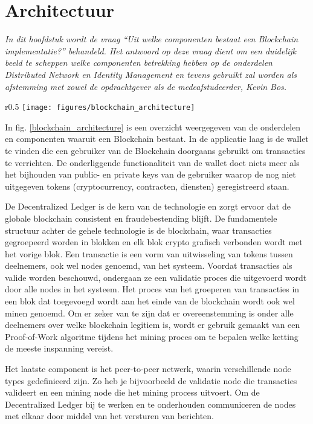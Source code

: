 \section{Architectuur}
\label{chapter:architecture}

\textit{
  In dit hoofdstuk wordt de vraag ``Uit welke componenten bestaat een Blockchain implementatie?'' behandeld. Het antwoord op deze vraag dient om een duidelijk beeld te scheppen welke componenten betrekking hebben op de onderdelen Distributed Network en Identity Management en tevens gebruikt zal worden als afstemming met zowel de opdrachtgever als de medeafstudeerder, Kevin Bos. 
}

\begin{wrapfigure}{r}{0.5\textwidth}
  \texttt{[image: figures/blockchain\_architecture]}
  \caption{Blockchain architectuur}
  \label{blockchain_architecture}
\end{wrapfigure}

In fig. \ref{blockchain_architecture} is een overzicht weergegeven van de onderdelen en componenten waaruit een Blockchain bestaat. In de applicatie laag is de wallet te vinden die een gebruiker van de Blockchain doorgaans gebruikt om transacties te verrichten. De onderliggende functionaliteit van de wallet doet niets meer als het bijhouden van public- en private keys van de gebruiker waarop de nog niet uitgegeven tokens (cryptocurrency, contracten, diensten) geregistreerd staan.

De Decentralized Ledger is de kern van de technologie en zorgt ervoor dat de globale blockchain consistent en fraudebestending blijft. De fundamentele structuur achter de gehele technologie is de blockchain, waar transacties gegroepeerd worden in blokken en elk blok crypto grafisch verbonden wordt met het vorige blok. Een transactie is een vorm van uitwisseling van tokens tussen deelnemers, ook wel nodes genoemd, van het systeem. Voordat transacties als valide worden beschouwd, ondergaan ze een validatie proces die uitgevoerd wordt door alle nodes in het systeem. Het proces van het groeperen van transacties in een blok dat toegevoegd wordt aan het einde van de blockchain wordt ook wel minen genoemd. Om er zeker van te zijn dat er overeenstemming is onder alle deelnemers over welke blockchain legitiem is, wordt er gebruik gemaakt van een Proof-of-Work algoritme tijdens het mining proces om te bepalen welke ketting de meeste inspanning vereist.

Het laatste component is het peer-to-peer netwerk, waarin verschillende node types gedefinieerd zijn. Zo heb je bijvoorbeeld de validatie node die transacties valideert en een mining node die het mining process uitvoert. Om de Decentralized Ledger bij te werken en te onderhouden communiceren de nodes met elkaar door middel van het versturen van berichten.